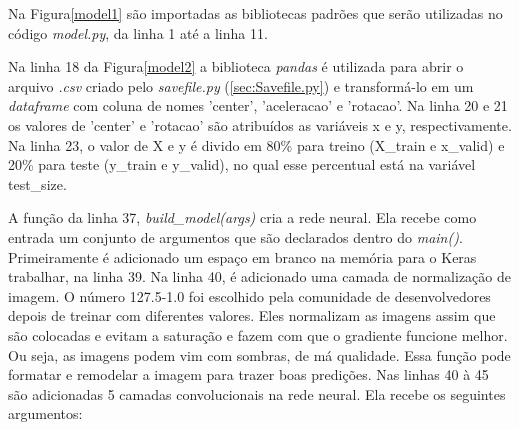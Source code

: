 Na Figura\ref{model1} são importadas as bibliotecas padrões que serão utilizadas no código \textit{model.py}, da linha 1 até a linha 11.

	\begin{figure}[H]
		\centering
\end{figure}

Na linha 18 da Figura\ref{model2} a biblioteca \textit{pandas} é utilizada para abrir o arquivo \textit{.csv} criado pelo \textit{savefile.py} (\ref{sec:Savefile.py}) e transformá-lo em um \textit{dataframe} com coluna de nomes 'center', 'aceleracao' e 'rotacao'.
Na linha 20 e 21 os valores de 'center' e 'rotacao' são atribuídos as variáveis x e y, respectivamente. Na linha 23, o valor de X e y é divido em 80\% para treino (X\_train e x\_valid) e 20\% para teste (y\_train e y\_valid), no qual esse percentual está na variável test\_size.

	\begin{figure}[H]
		\centering
\end{figure}
A função da linha 37, \textit{build\_model(args)} cria a rede neural. Ela recebe como entrada um conjunto de argumentos que são declarados dentro do \textit{main()}.
Primeiramente é adicionado um espaço em branco na memória para o Keras trabalhar, na linha 39. 
Na linha 40, é adicionado uma camada de normalização de imagem. O número 127.5-1.0 foi escolhido pela comunidade de desenvolvedores depois de treinar com diferentes valores. Eles normalizam as imagens assim que são colocadas e evitam a saturação e fazem com que o gradiente funcione melhor. Ou seja, as imagens podem vim com sombras, de má qualidade. Essa função pode formatar e remodelar a imagem para trazer boas predições.
Nas linhas 40 à 45 são adicionadas 5 camadas convolucionais na rede neural. Ela recebe os seguintes argumentos: 

